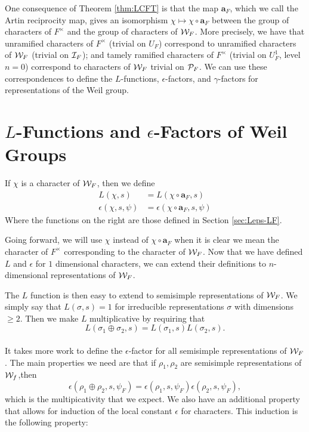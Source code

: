 One consequence of Theorem \ref{thm:LCFT} is that the map $\bm{a}_F$, which we call the Artin reciprocity map, gives an isomorphism $\chi \mapsto \chi \circ \bm{a}_F$ between the group of characters of $F^\times$ and the group of characters of $\mathcal{W}_F$.
More precisely, we have that unramified characters of $F^\times$ (trivial on $U_F$) correspond to unramified characters of $\mathcal{W}_F$ (trivial on $\mathcal{I}_F$); and tamely ramified characters of $F^\times$ (trivial on $U_F^1$, level $n=0$) correspond to characters of $\mathcal{W}_F$ trivial on $\mathcal{P}_F$.
We can use these correspondences to define the $L$-functions, $\epsilon$-factors, and $\gamma$-factors for representations of the Weil group.

\section{$L$-Functions and $\epsilon$-Factors of Weil Groups}
\label{sec:Leps-weil-group}
\begin{defn}
  If $\chi$ is a character of $\mathcal{W}_F$, then we define
  \begin{align*}
    L(\chi, s) &= L(\chi \circ \bm{a}_F, s) \\
    \epsilon(\chi, s, \psi) &= \epsilon(\chi \circ \bm{a}_F, s, \psi)
  \end{align*}
  Where the functions on the right are those defined in Section \ref{sec:Leps-LF}.
\end{defn}
Going forward, we will use $\chi$ instead of $\chi \circ \bm{a}_F$ when it is clear we mean the character of $F^\times$ corresponding to the character of $\mathcal{W}_F$.
Now that we have defined $L$ and $\epsilon$ for $1$ dimensional characters, we can extend their definitions to $n$-dimensional representations of $\mathcal{W}_F$.

The $L$ function is then easy to extend to semisimple representations of $\mathcal{W}_F$.
We simply say that $L(\sigma,s) = 1$ for irreducible representations $\sigma$ with dimensions $\geq 2$.
Then we make $L$ multiplicative by requiring that
\[L(\sigma_1 \oplus \sigma_2,s) = L(\sigma_1,s)L(\sigma_2,s).\]
\\

It takes more work to define the $\epsilon$-factor for all semisimple representations of $\mathcal{W}_F$.
The main properties we need are that if $\rho_1, \rho_2$ are semisimple representations of $\mathcal{W}_f$,then 
\[\epsilon(\rho_1 \oplus \rho_2,s,\psi_F) = \epsilon(\rho_1,s,\psi_F)\epsilon(\rho_2,s,\psi_F),\]
which is the multipicativity that we expect.
We also have an additional property that allows for induction of the local constant $\epsilon$ for characters.
This induction is the following property:

